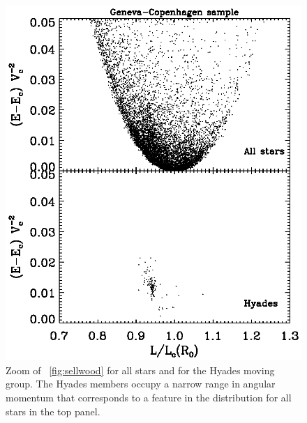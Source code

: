 \clearpage
\begin{figure}
\includegraphics{figs_groups/sellwood_gcs_hyades.ps}
\caption[Zoom of \figurename~\ref{fig:sellwood} for all stars and for
  the Hyades moving group]{Zoom of \figurename~\ref{fig:sellwood} for
  all stars and for the Hyades moving group. The Hyades members occupy
  a narrow range in angular momentum that corresponds to a feature in
  the distribution for all stars in the top
  panel.}\label{fig:sellwood_hyades}
\end{figure}
